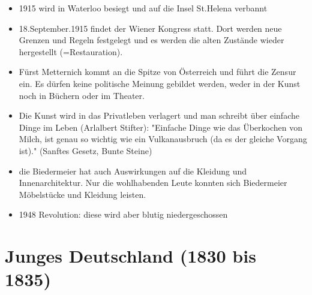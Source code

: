 \documentclass[12pt,a4paper]{article}
\begin{document}
\begin{itemize}
\item 1915 wird in Waterloo besiegt und auf die Insel St.Helena verbannt
\item 18.September.1915 findet der Wiener Kongress statt. Dort werden neue Grenzen und Regeln festgelegt und es werden die alten Zustände wieder hergestellt (=Restauration).
\item Fürst Metternich kommt an die Spitze von Österreich und führt die Zensur ein. Es dürfen keine politische Meinung gebildet werden, weder in der Kunst noch in Büchern oder im Theater.
\item Die Kunst wird in das Privatleben verlagert und man schreibt über einfache Dinge im Leben (Arlalbert Stifter): "Einfache Dinge wie das Überkochen von Milch, ist genau so wichtig wie ein Vulkanausbruch (da es der gleiche Vorgang ist)." (Sanftes Gesetz, Bunte Steine)
\item die Biedermeier hat auch Auswirkungen auf die Kleidung und Innenarchitektur. Nur die wohlhabenden Leute konnten sich Biedermeier Möbelstücke und Kleidung leisten.
\item 1948 Revolution: diese wird aber blutig niedergeschossen	
\end{itemize}
	
\newpage	
	
\section{Junges Deutschland (1830 bis 1835)}
\end{document}
